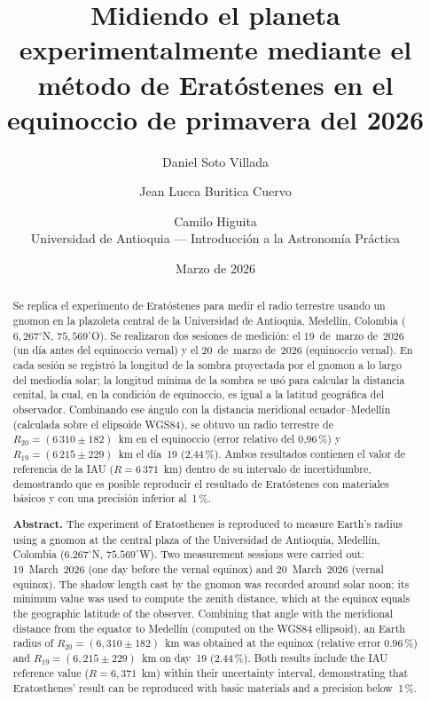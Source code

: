 \documentclass[12pt,a4paper]{article}
\title{\textbf{Midiendo el planeta experimentalmente mediante el método de Eratóstenes en el equinoccio de primavera del 2026}}
\author{
  Daniel Soto Villada \and
  Jean Lucca Buritica Cuervo \and
  Camilo Higuita\\[0.5em]
  \small Universidad de Antioquia --- Introducción a la Astronomía Práctica
}
\date{Marzo de 2026}
\begin{document}
\maketitle

\begin{abstract}
Se replica el experimento de Eratóstenes para medir el radio terrestre
usando un gnomon en la plazoleta central de la Universidad de Antioquia,
Medellín, Colombia ($6{,}267^\circ$N, $75{,}569^\circ$O).
Se realizaron dos sesiones de medición: el 19~de~marzo de~2026 (un día
antes del equinoccio vernal) y el 20~de~marzo de~2026 (equinoccio vernal).
En cada sesión se registró la longitud de la sombra proyectada por el
gnomon a lo largo del mediodía solar; la longitud mínima de la sombra
se usó para calcular la distancia cenital, la cual, en la condición de
equinoccio, es igual a la latitud geográfica del observador.
Combinando ese ángulo con la distancia meridional ecuador--Medellín
(calculada sobre el elipsoide WGS84), se obtuvo un radio terrestre de
$R_{20} = (6\,310 \pm 182)$~km en el equinoccio (error relativo del
0{,}96\,\%) y $R_{19} = (6\,215 \pm 229)$~km el día~19 (2{,}44\,\%).
Ambos resultados contienen el valor de referencia de la IAU
($R = 6\,371$~km) dentro de su intervalo de incertidumbre,
demostrando que es posible reproducir el resultado de Eratóstenes
con materiales básicos y con una precisión inferior al~1\,\%.

\bigskip
\noindent\textbf{Abstract.}
The experiment of Eratosthenes is reproduced to measure Earth's radius
using a gnomon at the central plaza of the Universidad de Antioquia,
Medellín, Colombia ($6.267^\circ$N, $75.569^\circ$W).
Two measurement sessions were carried out: 19~March~2026 (one day before
the vernal equinox) and 20~March~2026 (vernal equinox).
The shadow length cast by the gnomon was recorded around solar noon;
its minimum value was used to compute the zenith distance, which at the
equinox equals the geographic latitude of the observer.
Combining that angle with the meridional distance from the equator to
Medellín (computed on the WGS84 ellipsoid), an Earth radius of
$R_{20} = (6{,}310 \pm 182)$~km was obtained at the equinox
(relative error 0.96\,\%) and $R_{19} = (6{,}215 \pm 229)$~km on
day~19 (2.44\,\%).  Both results include the IAU reference value
($R = 6{,}371$~km) within their uncertainty interval, demonstrating
that Eratosthenes' result can be reproduced with basic materials
and a precision below~1\,\%.
\end{abstract}
\end{document}
